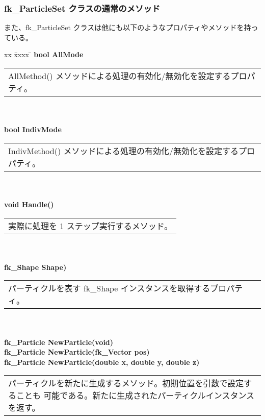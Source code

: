 \subsubsection{fk\_ParticleSet クラスの通常のメソッド}
また、fk\_ParticleSet クラスは他にも以下のようなプロパティやメソッドを持っている。
\begin{tabbing}
xx \= xxxx \= \kill
\> \textbf{bool AllMode} \\
	\> \> \begin{tabular}{p{15cm}}
		AllMethod() メソッドによる処理の有効化/無効化を設定するプロパティ。
	\end{tabular} \\ \\

\> \textbf{bool IndivMode} \\
	\> \> \begin{tabular}{p{15cm}}
		IndivMethod() メソッドによる処理の有効化/無効化を設定するプロパティ。
	\end{tabular} \\ \\

\> \textbf{void Handle()} \\
	\> \> \begin{tabular}{p{15cm}}
		実際に処理を 1 ステップ実行するメソッド。
	\end{tabular} \\ \\

\> \textbf{fk\_Shape Shape)} \\
	\> \> \begin{tabular}{p{15cm}}
		パーティクルを表す fk\_Shape インスタンスを取得するプロパティ。
	\end{tabular} \\ \\

\> \textbf{fk\_Particle NewParticle(void)} \\
\> \textbf{fk\_Particle NewParticle(fk\_Vector pos)} \\
\> \textbf{fk\_Particle NewParticle(double x, double y, double z)} \\
	\> \> \begin{tabular}{p{15cm}}
		パーティクルを新たに生成するメソッド。初期位置を引数で設定することも
		可能である。新たに生成されたパーティクルインスタンスを返す。
	\end{tabular} \\ \\


\end{tabbing}

